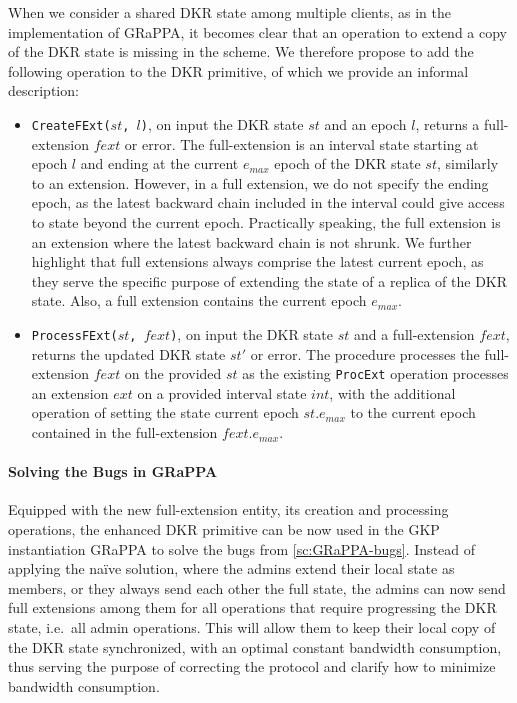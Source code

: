 When we consider a shared DKR state among multiple clients,
as in the implementation of GRaPPA, it becomes clear
that an operation to extend a copy of the DKR state is
missing in the scheme.
We therefore propose to add the following operation to the DKR
primitive, of which we provide an informal description:

\begin{itemize}
    \item \texttt{CreateFExt($st$, $l$)}, on input the DKR state $st$ and an epoch $l$,
    returns a full-extension $fext$ or error. The full-extension is an interval state
    starting at epoch $l$ and ending at the current $e_{max}$ epoch of the DKR state
    $st$, similarly to an extension. However, in a full extension, we do not 
    specify the ending epoch, as the latest backward chain included in the interval
    could give access to state beyond the current epoch. Practically speaking,
    the full extension is an extension where the latest backward chain is not shrunk.
    We further highlight that full extensions always comprise the latest current epoch,
    as they serve the specific purpose of extending the state of a replica of the DKR state.
    Also, a full extension contains the current epoch $e_{max}$.

    \item \texttt{ProcessFExt($st$, $fext$)}, on input the DKR state $st$ and a full-extension $fext$,
    returns the updated DKR state $st'$ or error. The procedure processes the full-extension
    $fext$ on the provided $st$ as the existing \texttt{ProcExt} operation processes an extension $ext$
    on a provided interval state $int$, with the additional
    operation of setting the state current epoch $st.e_{max}$ to the current epoch contained
    in the full-extension $fext.e_{max}$.
    
\end{itemize}

\paragraph{Solving the Bugs in GRaPPA}
Equipped with the new full-extension entity, its creation and processing operations,
the enhanced DKR primitive can be now used in the GKP instantiation
GRaPPA to solve the bugs from \cref{sc:GRaPPA-bugs}.
Instead of applying the na\"ive solution, where the admins extend their local state as members, or they always send each other the full state, the admins can now send full extensions among them for all operations that require progressing the DKR state,
i.e.\ all admin operations.
This will allow them to keep their local copy of
the DKR state synchronized, with an optimal constant bandwidth 
consumption, thus serving the purpose of correcting the 
protocol and clarify how to minimize bandwidth consumption.

